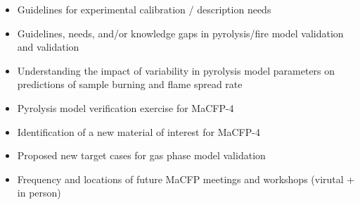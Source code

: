 \documentclass[12pt]{article}
\begin{document}
\begin{itemize}[noitemsep]
\item Guidelines for experimental calibration / description needs
\item Guidelines, needs, and/or knowledge gaps in pyrolysis/fire model validation and validation
\item Understanding the impact of variability in pyrolysis model parameters on predictions of sample burning and flame spread rate
\item Pyrolysis model verification exercise for MaCFP-4
\item Identification of a new material of interest for MaCFP-4
\item Proposed new target cases for gas phase model validation
\item Frequency and locations of future MaCFP meetings and workshops (virutal + in person)
\end{itemize}
\end{document}
